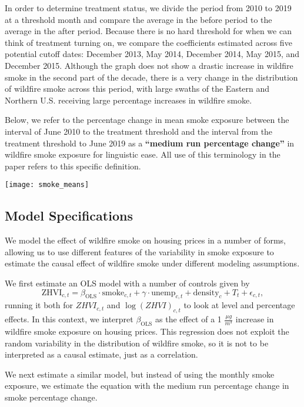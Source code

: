 \documentclass[12pt]{article}
\begin{document}
In order to determine treatment status, we divide the period from 2010 to 2019 at a threshold month and compare the average in the before period to the average in the after period.  Because there is no hard threshold for when we can think of treatment turning on, we compare the coefficients estimated across five potential cutoff dates: December 2013, May 2014, December 2014, May 2015, and December 2015.  Although the graph does not show a drastic increase in wildfire smoke in the second part of the decade, there is a very change in the distribution of wildfire smoke across this period, with large swaths of the Eastern and Northern U.S. receiving large percentage increases in wildfire smoke.  

Below, we refer to the percentage change in mean smoke exposure between the interval of June 2010 to the treatment threshold and the interval from the treatment threshold to June 2019 as a \textbf{``medium run percentage change''} in wildfire smoke exposure for linguistic ease.  All use of this terminology in the paper refers to this specific definition. 

\texttt{[image: smoke\_means]}

\subsection{Model Specifications}

We model the effect of wildfire smoke on housing prices in a number of forms, allowing us to use different features of the variability in smoke exposure to estimate the causal effect of wildfire smoke under different modeling assumptions.  

We first estimate an OLS model with a number of controls given by
$$\text{ZHVI}_{c,t} = \beta_\text{OLS}\cdot \text{smoke}_{c,t} + \gamma\cdot \text{unemp}_{c,t} + \text{density}_c + T_t + \epsilon_{c,t},$$ running it both for $ZHVI_{c,t}$ and $\log(ZHVI)_{c,t}$ to look at level and percentage effects.  In this context, we interpret $\beta_\text{OLS}$ as the effect of a 1 $\frac{\mu g}{m^3}$ increase in wildfire smoke exposure on housing prices.  This regression does not exploit the random variability in the distribution of wildfire smoke, so it is not to be interpreted as a causal estimate, just as a correlation.  

We next estimate a similar model, but instead of using the monthly smoke exposure, we estimate the equation with the medium run percentage change in smoke percentage change.  
\end{document}

